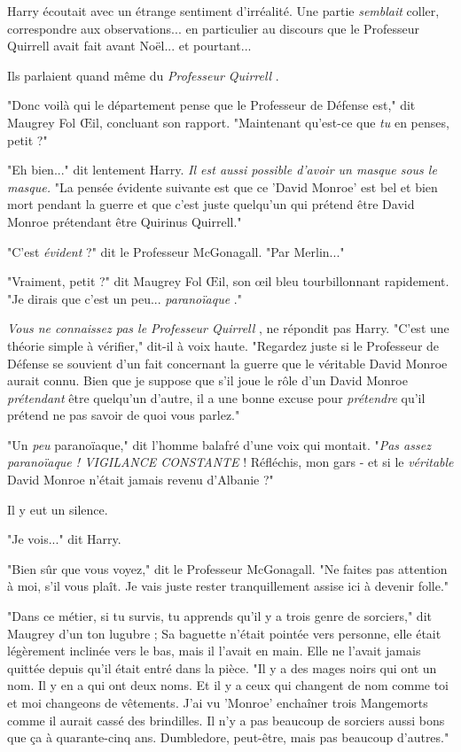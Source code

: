 Harry écoutait avec un étrange sentiment d'irréalité. Une partie \emph{semblait } coller, correspondre aux observations... en particulier au discours que le Professeur Quirrell avait fait avant Noël... et pourtant...

Ils parlaient quand même du \emph{Professeur Quirrell} .

"Donc voilà qui le département pense que le Professeur de Défense est," dit Maugrey Fol Œil, concluant son rapport. "Maintenant qu'est-ce que \emph{tu}  en penses, petit ?"

"Eh bien..." dit lentement Harry. \emph{Il est aussi possible d'avoir un masque sous le masque.} "La pensée évidente suivante est que ce 'David Monroe' est bel et bien mort pendant la guerre et que c'est juste quelqu'un qui prétend être David Monroe prétendant être Quirinus Quirrell."

"C'est \emph{évident } ?" dit le Professeur McGonagall. "Par Merlin..."

"Vraiment, petit ?" dit Maugrey Fol Œil, son œil bleu tourbillonnant rapidement. "Je dirais que c'est un peu... \emph{paranoïaque} ."

\emph{Vous ne connaissez pas le Professeur Quirrell} , ne répondit pas Harry. "C'est une théorie simple à vérifier," dit-il à voix haute. "Regardez juste si le Professeur de Défense se souvient d'un fait concernant la guerre que le véritable David Monroe aurait connu. Bien que je suppose que s'il joue le rôle d'un David Monroe \emph{prétendant } être quelqu'un d'autre, il a une bonne excuse pour \emph{prétendre } qu'il prétend ne pas savoir de quoi vous parlez."

"Un \emph{peu}  paranoïaque," dit l'homme balafré d'une voix qui montait. "\emph{Pas assez paranoïaque ! VIGILANCE CONSTANTE}  ! Réfléchis, mon gars - et si le \emph{véritable}  David Monroe n'était jamais revenu d'Albanie ?"

Il y eut un silence.

"Je vois..." dit Harry.

"Bien sûr que vous voyez," dit le Professeur McGonagall. "Ne faites pas attention à moi, s'il vous plaît. Je vais juste rester tranquillement assise ici à devenir folle."

"Dans ce métier, si tu survis, tu apprends qu'il y a trois genre de sorciers," dit Maugrey d'un ton lugubre ; Sa baguette n'était pointée vers personne, elle était légèrement inclinée vers le bas, mais il l'avait en main. Elle ne l'avait jamais quittée depuis qu'il était entré dans la pièce. "Il y a des mages noirs qui ont un nom. Il y en a qui ont deux noms. Et il y a ceux qui changent de nom comme toi et moi changeons de vêtements. J'ai vu 'Monroe' enchaîner trois Mangemorts comme il aurait cassé des brindilles. Il n'y a pas beaucoup de sorciers aussi bons que ça à quarante-cinq ans. Dumbledore, peut-être, mais pas beaucoup d'autres."

